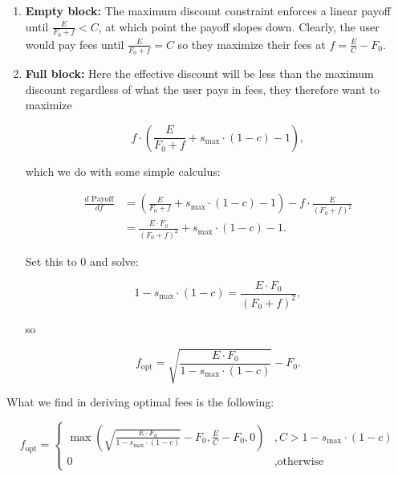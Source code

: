         \begin{enumerate}
            \item \textbf{Empty block:} The maximum discount constraint enforces a linear payoff until $\frac{E}{F_0 + f} < C$, at which point the payoff slopes down. Clearly, the user would pay fees until $\frac{E}{F_0 + f} = C$ so they maximize their fees at $f = \frac{E}{C} - F_0$.
            \item \textbf{Full block:} Here the effective discount will be less than the maximum discount regardless of what the user pays in fees, they therefore want to maximize
    
            \begin{equation}
                f \cdot \left(\frac{E}{F_0 + f} + s_{\text{max}} \cdot (1-c) - 1 \right),
            \end{equation}
        
            which we do with some simple calculus:
            
            \begin{align*}
                \frac{d\text{ Payoff}}{df} &= \left(\frac{E}{F_0 + f} + s_{\text{max}} \cdot (1-c) - 1 \right) - f \cdot \frac{E}{(F_0 + f)^2} \\ 
                &= \frac{E \cdot F_0}{(F_0 + f)^2} + s_{\text{max}} \cdot (1- c) - 1.
            \end{align*}
    
            Set this to 0 and solve:

            \begin{equation}
                1 - s_{\text{max}} \cdot (1-c) = \frac{E \cdot F_0}{(F_0 + f)^2},
            \end{equation}
    
            so

            \begin{equation}
                f_{\text{opt}} = \sqrt{\frac{E \cdot F_0}{1 - s_{\text{max}} \cdot (1-c)}} - F_0.
            \end{equation}
        \end{enumerate}
    

    What we find in deriving optimal fees is the following:

    \begin{equation}
        f_{\text{opt}}=\begin{cases}\max{\left(\sqrt{\frac{E\cdot F_0}{1 - s_{\text{max}}\cdot (1-c)}} - F_0,\frac{E}{C} - F_0, 0\right)} &, C > 1-s_{\text{max}} \cdot (1-c) \\ 0 &, \text{otherwise}\end{cases}
    \end{equation}
    
